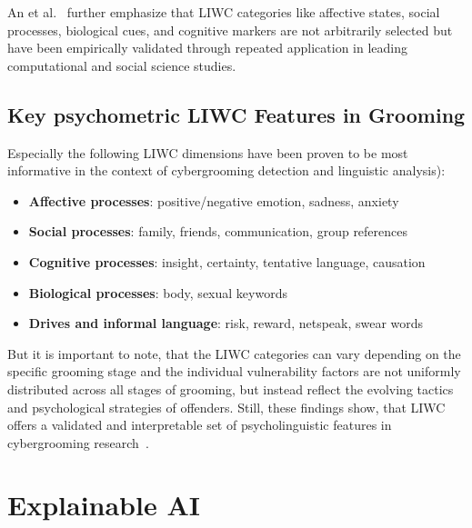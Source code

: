 An et al.~\cite{an2025cybergrooming} further emphasize that LIWC categories like affective states, social processes, biological cues, and cognitive markers are not arbitrarily selected but have been empirically validated through repeated application in leading computational and social science studies. %


\subsection{Key psychometric LIWC Features in Grooming} \label{psychometric_liwc_features_in_grooming}
Especially the following LIWC dimensions have been proven to be most informative in the context of cybergrooming detection and linguistic analysis\cite{gupta2012characterizingpedophileconversationsinternet,broome2020psycholinguistic,an2025cybergrooming}):
\begin{itemize}
    \item \textbf{Affective processes}: positive/negative emotion, sadness, anxiety
    \item \textbf{Social processes}: family, friends, communication, group references
    \item \textbf{Cognitive processes}: insight, certainty, tentative language, causation
    \item \textbf{Biological processes}: body, sexual keywords
    \item \textbf{Drives and informal language}: risk, reward, netspeak, swear words
\end{itemize} %

But it is important to note, that the LIWC categories can vary depending on the specific grooming stage \cite{Cano2014} and the individual vulnerability factors are not uniformly distributed across all stages of grooming, but instead reflect the evolving tactics and psychological strategies of offenders. Still, these findings show, that LIWC offers a validated and interpretable set of psycholinguistic features in cybergrooming research~\cite{an2025cybergrooming, gupta2012characterizingpedophileconversationsinternet, Cano2014, guo2023text,broome2020psycholinguistic}. 
\section{Explainable AI}

